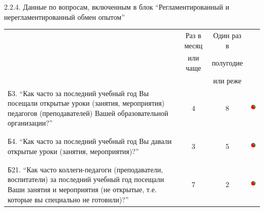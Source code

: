 \begin{frame}{2.2.4. Данные по вопросам, включенным в блок ``Регламентированный и нерегламентированный обмен опытом'' }

\tiny

\begin{tabular}{lccl}

 & Раз в месяц  & Один раз в  &\\
 & или чаще    & полугодие  &\\
 &      &  или реже &\\

\begin{minipage}{0.5\textwidth}
Б3.  ``Как часто за последний учебный год Вы посещали открытые уроки (занятия, мероприятия) педагогов (преподавателей)  Вашей образовательной организации?''
\end{minipage}
& 4 & 8 &
\begin{minipage}{1.55cm}
\includegraphics[width=1.5cm, height=1.5cm]{diag.png}
\end{minipage}
\\[0.5cm]

\begin{minipage}{0.5\textwidth}
Б4. ``Как часто за последний учебный год Вы давали открытые уроки (занятия, мероприятия)?''
\end{minipage}
& 3 & 5 & 
\begin{minipage}{1.55cm}
\includegraphics[width=1.5cm, height=1.5cm]{diag.png}
\end{minipage}
\\[0.5cm]

\begin{minipage}{0.5\textwidth}
Б21. ``Как часто коллеги-педагоги (преподаватели, воспитатели) за последний учебный год посещали Ваши занятия и мероприятия (не открытые, т.е. которые вы специально не готовили)?''
\end{minipage}
& 7 & 2 &
\begin{minipage}{1.55cm}
\includegraphics[width=1.5cm, height=1.5cm]{diag.png}
\end{minipage}
\\[0.5cm]


\end{tabular}
\end{frame}

